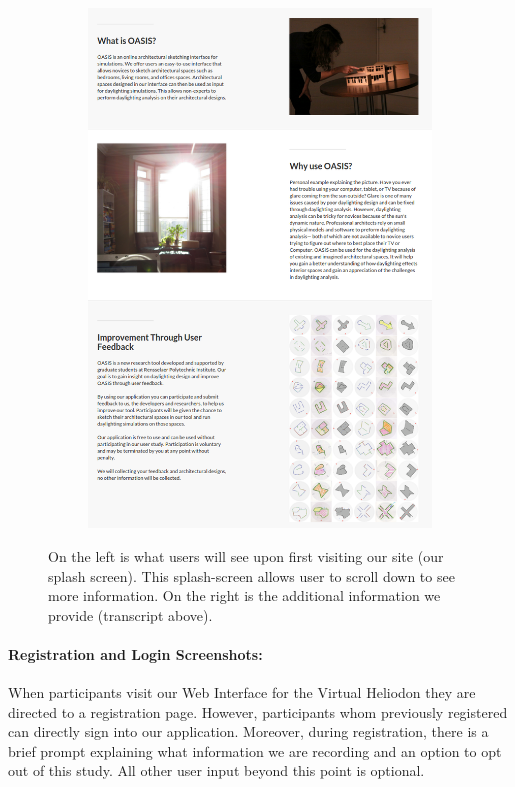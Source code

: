 \documentclass[12pt]{article}
\begin{document}
\begin{figure}[h]
\begin{subfigure}{.5\textwidth}
    \includegraphics[scale=0.3]{big_img}
  \end{subfigure}

\caption{On the left is what users will see upon first visiting our site (our splash screen). This splash-screen allows user to scroll down to see more information.  On the right is the additional information we provide (transcript above).}  
\label{fig:splash}
\end{figure}
\newpage


\paragraph{Registration and Login Screenshots:}
When participants visit our Web Interface for the Virtual Heliodon they are directed to a registration page. 
However, participants whom previously registered can directly sign into our application. Moreover, during registration, there is a brief prompt explaining what information we are recording and an option to opt out of this study.  All other user input beyond this point is optional.\\
\end{document}

